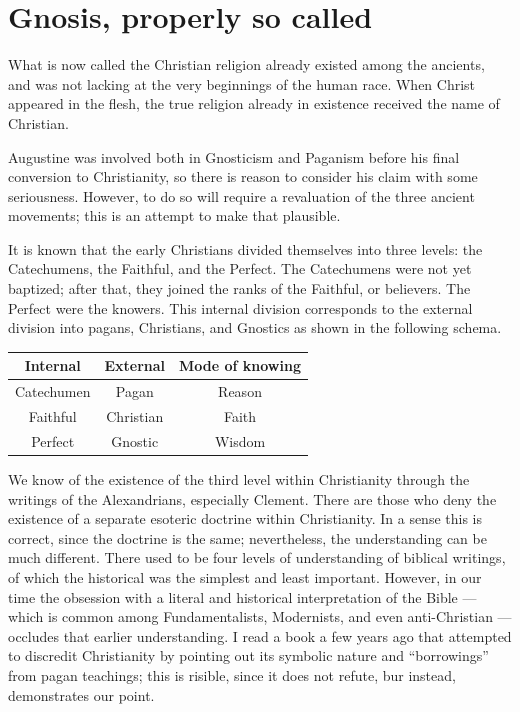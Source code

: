 \section{Gnosis, properly so called}

\begin{quotex}
What is now called the Christian religion already existed among the ancients, and was not lacking at the very beginnings of the human race. When Christ appeared in the flesh, the true religion already in existence received the name of Christian.
\end{quotex}


Augustine was involved both in Gnosticism and Paganism before his final conversion to Christianity, so there is reason to consider his claim with some seriousness. However, to do so will require a revaluation of the three ancient movements; this is an attempt to make that plausible.

It is known that the early Christians divided themselves into three levels: the Catechumens, the Faithful, and the Perfect. The Catechumens were not yet baptized; after that, they joined the ranks of the Faithful, or believers. The Perfect were the knowers. This internal division corresponds to the external division into pagans, Christians, and Gnostics as shown in the following schema.

\begin{table}[h]\small\centering
\begin{tabular}{ccc}\toprule
Internal & External & Mode of knowing \\\midrule

Catechumen & Pagan & Reason \\

Faithful & Christian & Faith \\

Perfect & Gnostic & Wisdom \\\bottomrule
\end{tabular}
\end{table}

We know of the existence of the third level within Christianity through the writings of the Alexandrians, especially Clement. There are those who deny the existence of a separate esoteric doctrine within Christianity. In a sense this is correct, since the doctrine is the same; nevertheless, the understanding can be much different. There used to be four levels of understanding of biblical writings, of which the historical was the simplest and least important. However, in our time the obsession with a literal and historical interpretation of the Bible --- which is common among Fundamentalists, Modernists, and even anti-Christian --- occludes that earlier understanding. I read a book a few years ago that attempted to discredit Christianity by pointing out its symbolic nature and ``borrowings'' from pagan teachings; this is risible, since it does not refute, bur instead, demonstrates our point.

